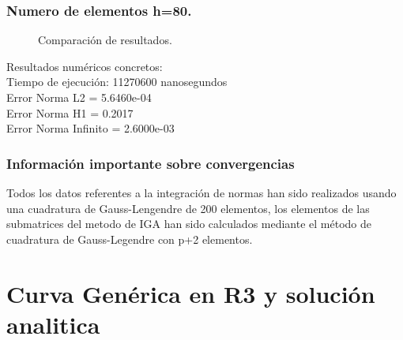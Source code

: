\documentclass[12pt]{article}
\begin{document}
\subsubsection{Numero de elementos h=80.}
\begin{figure}[H]
    \centering
    \begin{subfigure}{0.32\textwidth}
        
    \end{subfigure}
    \hfill
    \begin{subfigure}{0.32\textwidth}
        
    \end{subfigure}
    \hfill
    \begin{subfigure}{0.32\textwidth}
        
    \end{subfigure}
    \caption{Comparación de resultados.}
    \label{fig:tresgraficas}
\end{figure}
Resultados numéricos concretos:\\
Tiempo de ejecución: 11270600 nanosegundos\\
Error Norma L2 = 5.6460e-04\\
Error Norma H1 = 0.2017\\
Error Norma Infinito = 2.6000e-03\\

\subsubsection{Información importante sobre convergencias}
Todos los datos referentes a la integración de normas han sido realizados usando una cuadratura de Gauss-Lengendre de 200 elementos,
los elementos de las submatrices del metodo de IGA han sido calculados mediante el método de cuadratura de Gauss-Legendre con p+2 elementos.
\section{Curva Genérica en R3 y solución analitica}
\end{document}
